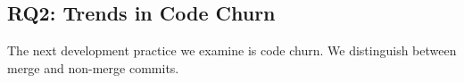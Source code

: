 


%





\subsection{RQ2: Trends in Code Churn}

The next development practice we examine is code churn.
We distinguish between merge and non-merge commits.

